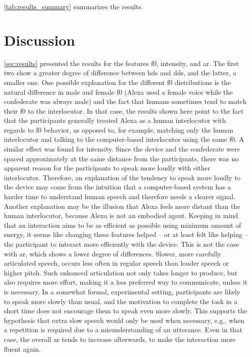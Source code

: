 \cref{tab:results_summary} summarizes the results.

\section{Discussion}
\label{sec:discussion}

\cref{sec:results} presented the results for the features \ac{f0}, intensity, and \acf{ar}.
The first two show a greater degree of difference between \ac{hds} and \ac{dds}, and the latter, a smaller one.
One possible explanation for the different \ac{f0} distributions is the natural difference in male and female \ac{f0} (Alexa used a female voice while the confederate was always male) and the fact that humans sometimes tend to match their \ac{f0} to the interlocutor.
In that case, the results shown here point to the fact that the participants generally treated Alexa as a human interlocutor with regards to \ac{f0} behavior, as opposed to, for example, matching only the human interlocutor and talking to the computer-based interlocutor using the same \ac{f0}.
A similar effect was found for intensity.
Since the device and the confederate were spaced approximately at the same distance from the participants, there was no apparent reason for the participants to speak more loudly with either interlocutor.
Therefore, an explanation of the tendency to speak more loudly to the device may come from the intuition that a computer-based system has a harder time to understand human speech and therefore needs a clearer signal.
Another explanation may be the illusion that Alexa feels more distant than the human interlocutor, because Alexa is not an embodied agent.
Keeping in mind that an interaction aims to be as efficient as possible using minimum amount of energy, it seems like changing these features helped -- or at least felt like helping -- the participant to interact more efficiently with the device.
This is not the case with \ac{ar}, which shows a lower degree of differences.
Slower, more carefully articulated speech, occurs less often in regular speech than louder speech or higher pitch.
Such enhanced articulation not only takes longer to produce, but also requires more effort, making it a less preferred way to communicate, unless it is necessary.
In a somewhat formal, experimental setting, participants are likely to speak more slowly than usual, and the motivation to complete the task in a short time does not encourage them to speak even more slowly.
This supports the hypothesis that extra slow speech would only be used when necessary, e.g., when a repetition is required due to a misunderstanding of an utterance.
Even in that case, the overall \ac{ar} tends to increase afterwards, to make the interaction more fluent again.

